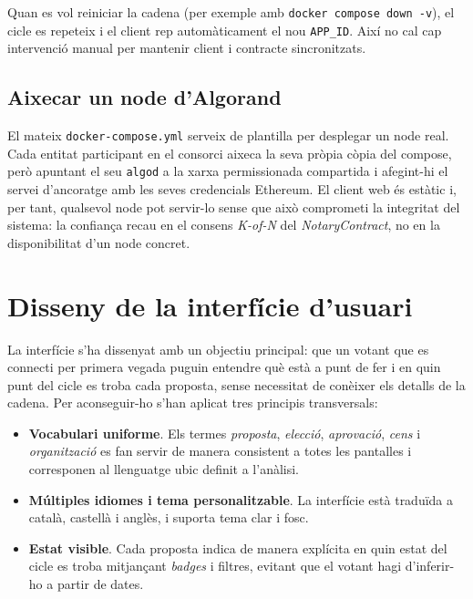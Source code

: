 Quan es vol reiniciar la cadena (per exemple amb \texttt{docker compose down -v}), el cicle es repeteix i el client rep
automàticament el nou \texttt{APP\_ID}.
Així no cal cap intervenció manual per mantenir client i contracte sincronitzats.

\subsection{Aixecar un node d'Algorand}
\label{subsec:aixecar-un-node-d'algorand}

El mateix \texttt{docker-compose.yml} serveix de plantilla per desplegar un node real.
Cada entitat participant en el consorci aixeca la seva pròpia còpia del compose, però apuntant el seu \texttt{algod} a
la xarxa permissionada compartida i afegint-hi el servei d'ancoratge amb les seves credencials Ethereum.
El client web és estàtic i, per tant, qualsevol node pot servir-lo sense que això comprometi la integritat del sistema:
la confiança recau en el consens \textit{K-of-N} del \textit{NotaryContract}, no en la disponibilitat d'un node concret.


\section{Disseny de la interfície d'usuari}
\label{sec:disseny-de-la-interficie-d'usuari}

La interfície s'ha dissenyat amb un objectiu principal: que un votant que es connecti per primera vegada puguin entendre
què està a punt de fer i en quin punt del cicle es troba cada proposta, sense necessitat de conèixer els detalls de la
cadena.
Per aconseguir-ho s'han aplicat tres principis transversals:

\begin{itemize}
    \item \textbf{Vocabulari uniforme}.
    Els termes \textit{proposta}, \textit{elecció}, \textit{aprovació}, \textit{cens} i \textit{organització} es fan
    servir de manera consistent a totes les pantalles i corresponen al llenguatge ubic definit a l'anàlisi.

    \item \textbf{Múltiples idiomes i tema personalitzable}.
    La interfície està traduïda a català, castellà i anglès, i suporta tema clar i fosc.

    \item \textbf{Estat visible}.
    Cada proposta indica de manera explícita en quin estat del cicle es troba mitjançant \textit{badges} i filtres,
    evitant que el votant hagi d'inferir-ho a partir de dates.
\end{itemize}

